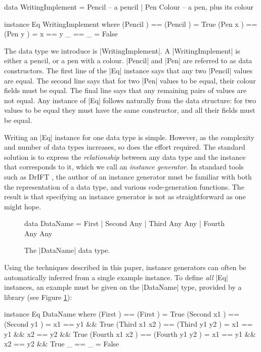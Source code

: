 \documentclass[preprint]{sigplanconf}
\begin{document}
\begin{code}
data WritingImplement  =  Pencil       -- a pencil
                       |  Pen Colour   -- a pen, plus its colour

instance Eq WritingImplement where
    (Pencil     )  == (Pencil     )  = True
    (Pen     x  )  == (Pen     y  )  = x == y
    _              == _              = False
\end{code}

The data type we introduce is |WritingImplement|. A |WritingImplement| is either a pencil, or a pen with a colour. |Pencil| and |Pen| are referred to as data constructors. The first line of the |Eq| instance says that any two |Pencil| values are equal. The second line says that for two |Pen| values to be equal, their colour fields must be equal. The final line says that any remaining pairs of values are not equal. Any instance of |Eq| follows naturally from the data structure: for two values to be equal they must have the same constructor, and all their fields must be equal.

Writing an |Eq| instance for one data type is simple. However, as the complexity and number of data types increases, so does the effort required. The standard solution is to express the \textit{relationship} between any data type and the instance that corresponds to it, which we call an \textit{instance generator}. In standard tools such as DrIFT \cite{drift}, the author of an instance generator must be familiar with both the representation of a data type, and various code-generation functions. The result is that specifying an instance generator is not as straightforward as one might hope.

\begin{figure}
\begin{code}
data DataName  =  First
               |  Second  Any
               |  Third   Any  Any
               |  Fourth  Any  Any
\end{code}
\caption{The |DataName| data type.}
\label{fig:dataname}
\end{figure}

Using the techniques described in this paper, instance generators can often be automatically inferred from a single example instance. To define \textit{all} |Eq| instances, an example must be given on the |DataName| type, provided by a library (see Figure \ref{fig:dataname}):

\begin{code}
instance Eq DataName where
    (First          )  == (First          )  = True
    (Second  x1     )  == (Second  y1     )  = x1 == y1 && True
    (Third   x1 x2  )  == (Third   y1 y2  )  = x1 == y1 && x2 == y2 && True
    (Fourth  x1 x2  )  == (Fourth  y1 y2  )  = x1 == y1 && x2 == y2 && True
    _                  == _                  = False
\end{code}
\end{document}
